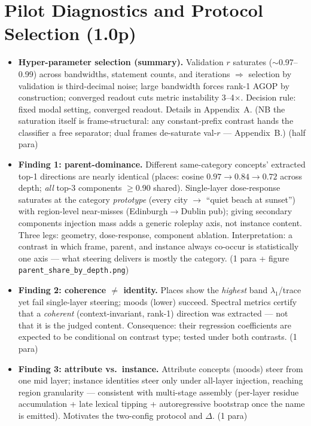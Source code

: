 \documentclass[11pt]{article}
\newenvironment{outline}{\color{gray!70!black}\begin{itemize}[leftmargin=1.2em,itemsep=1pt]}{\end{itemize}\color{black}}
\begin{document}
\section{Pilot Diagnostics and Protocol Selection (1.0p)}
\begin{outline}
\item \textbf{Hyper-parameter selection (summary).} Validation $r$ saturates ($\sim$0.97--0.99) across bandwidths, statement counts, and iterations $\Rightarrow$ selection by validation is third-decimal noise; large bandwidth forces rank-1 AGOP by construction; converged readout cuts metric instability 3--4$\times$. Decision rule: fixed modal setting, converged readout. Details in Appendix~A. (NB the saturation itself is frame-structural: any constant-prefix contrast hands the classifier a free separator; dual frames de-saturate val-$r$ --- Appendix~B.) (half para)
\item \textbf{Finding 1: parent-dominance.} Different same-category concepts' extracted top-1 directions are nearly identical (places: cosine $0.97 \to 0.84 \to 0.72$ across depth; \emph{all} top-3 components $\geq$0.90 shared). Single-layer dose-response saturates at the category \emph{prototype} (every city $\to$ ``quiet beach at sunset'') with region-level near-misses (Edinburgh$\to$Dublin pub); giving secondary components injection mass adds a generic roleplay axis, not instance content. Three legs: geometry, dose-response, component ablation. Interpretation: a contrast in which frame, parent, and instance always co-occur is statistically one axis --- what steering delivers is mostly the category. (1 para + figure \texttt{parent\_share\_by\_depth.png})
\item \textbf{Finding 2: coherence $\neq$ identity.} Places show the \emph{highest} band $\lambda_1$/trace yet fail single-layer steering; moods (lower) succeed. Spectral metrics certify that a \emph{coherent} (context-invariant, rank-1) direction was extracted --- not that it is the judged content. Consequence: their regression coefficients are expected to be conditional on contrast type; tested under both contrasts. (1 para)
\item \textbf{Finding 3: attribute vs.\ instance.} Attribute concepts (moods) steer from one mid layer; instance identities steer only under all-layer injection, reaching region granularity --- consistent with multi-stage assembly (per-layer residue accumulation + late lexical tipping + autoregressive bootstrap once the name is emitted). Motivates the two-config protocol and $\Delta$. (1 para)

\end{outline}
\end{document}
